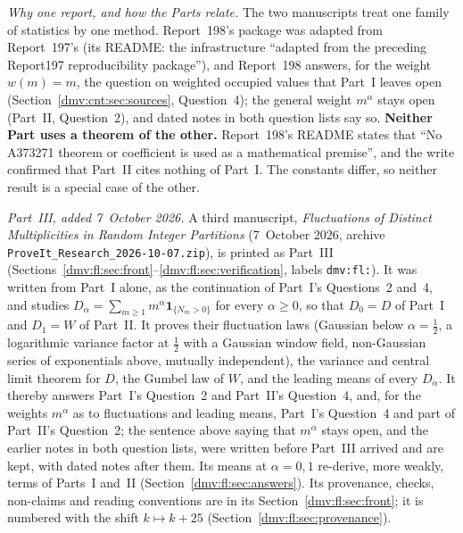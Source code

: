 \documentclass[11pt,letterpaper]{article}
\numberwithin{equation}{section}
\theoremstyle{definition}\newtheorem{definition}[theorem]{Definition}
\theoremstyle{remark}\newtheorem{remark}[theorem]{Remark}
\newcommand{\file}[1]{\nolinkurl{#1}}
\begin{document}
\emph{Why one report, and how the Parts relate.} The two manuscripts treat
one family of statistics by one method. Report~198's package was adapted
from Report~197's (its README: the infrastructure ``adapted from the
preceding Report197 reproducibility package''), and Report~198 answers, for
the weight $w(m)=m$, the question on weighted occupied values that Part~I
leaves open (Section~\ref{dmv:cnt:sec:sources}, Question~4); the general
weight $m^\alpha$ stays open (Part~II, Question~2), and dated notes in both
question lists say so. \textbf{Neither Part uses a theorem of the other.}
Report~198's README states that ``No A373271 theorem or coefficient is used
as a mathematical premise'', and the write confirmed that Part~II cites
nothing of Part~I. The constants differ, so neither result is a special
case of the other.

\emph{Part~III, added 7~October 2026.} A third manuscript, \emph{Fluctuations
of Distinct Multiplicities in Random Integer Partitions} (7~October 2026,
archive \file{ProveIt_Research_2026-10-07.zip}), is printed as Part~III
(Sections~\ref{dmv:fl:sec:front}--\ref{dmv:fl:sec:verification}, labels
\file{dmv:fl:}). It was written from Part~I alone, as the continuation of
Part~I's Questions~2 and~4, and studies
$D_\alpha=\sum_{m\ge1}m^\alpha\mathbf 1_{\{N_m>0\}}$ for every $\alpha\ge0$,
so that $D_0=D$ of Part~I and $D_1=W$ of Part~II. It proves their
fluctuation laws (Gaussian below $\alpha=\tfrac12$, a logarithmic variance
factor at $\tfrac12$ with a Gaussian window field, non-Gaussian series of
exponentials above, mutually independent), the variance and central limit
theorem for $D$, the Gumbel law of $W$, and the leading means of every
$D_\alpha$. It thereby answers Part~I's Question~2 and Part~II's
Question~4, and, for the weights $m^\alpha$ as to fluctuations and leading
means, Part~I's Question~4 and part of Part~II's Question~2; the sentence
above saying that
$m^\alpha$ stays open, and the earlier notes in both question lists, were
written before Part~III arrived and are kept, with dated notes after them.
Its means at $\alpha=0,1$ re-derive, more weakly, terms of Parts~I and~II
(Section~\ref{dmv:fl:sec:answers}). Its provenance, checks, non-claims and
reading conventions are in its Section~\ref{dmv:fl:sec:front}; it is
numbered with the shift $k\mapsto k+25$ (Section~\ref{dmv:fl:sec:provenance}).
\end{document}
